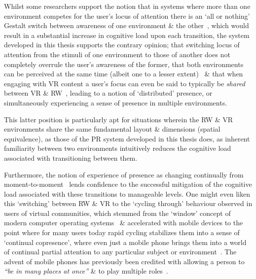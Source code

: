 
Whilst some researchers support the notion that in systems where more than one environment competes for the user's locus of attention there is an `all or nothing' Gestalt switch between awareness of one environment \& the other~\cite{Slater2002}, which would result in a substantial increase in cognitive load upon each transition, the system developed in this thesis supports the contrary opinion; that switching locus of attention from the stimuli of one environment to those of another does not completely overrule the user's awareness of the former, that both environments can be perceived at the same time (albeit one to a lesser extent)~\cite{Ijsselsteijn2001} \& that when engaging with VR content a user's focus can even be said to typically be \textit{shared} between VR \& RW~\cite{Waterworth2001}, leading to a notion of `distributed' presence, or simultaneously experiencing a sense of presence in multiple environments.

This latter position is particularly apt for situations wherein the RW \& VR environments share the same fundamental layout \& dimensions (spatial equivalence), as those of the PR system developed in this thesis does, as inherent familiarity between two environments intuitively reduces the cognitive load associated with transitioning between them.

Furthermore, the notion of experience of presence as changing continually from moment-to-moment~\cite{Heeter2003, Ijsselsteijn1998} lends confidence to the successful mitigation of the cognitive load associated with these transitions to manageable levels. One might even liken this `switching' between RW \& VR to the `cycling through' behaviour observed in users of virtual communities, which stemmed from the `window' concept of modern computer operating systems~\cite{Turkle2004} \& accelerated with mobile devices to the point where for many users today rapid cycling stabilizes them into a sense of `continual copresence', where even just a mobile phone brings them into a world of continual partial attention to any particular subject or environment~\cite{Turkle2011}. The advent of mobile phones has previously been credited with allowing a person to \textit{``be in many places at once''} \& to play multiple roles~\cite{Terashima2001}. %

